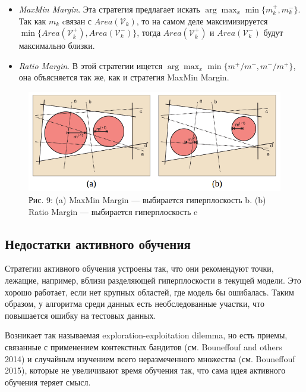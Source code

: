 \documentclass[]{article}
\begin{document}
\begin{itemize}
\item
  \emph{MaxMin Margin}. Эта стратегия предлагает искать
  \(\arg\max_x \min\{m^+_k, m^-_k\}\). Так как \(m_k\) cвязан с
  \(Area(\mathcal{V}_k)\), то на самом деле максимизируется
  \(\min\{Area(\mathcal{V}_k^+), Area(\mathcal{V}^-_k)\}\), тогда
  \(Area(\mathcal{V}_k^+)\) и \(Area(\mathcal{V}^-_k)\) будут
  максимально близки.
\item
  \emph{Ratio Margin}. В этой стратегии ищется
  \(\arg\max_x \min\{m^+/m^-, m^-/m^+\}\), она объясняется так же, как и
  стратегия MaxMin Margin.
\end{itemize}

\begin{figure}[htbp]
\centering
\includegraphics[width=5.72917in]{img/maxminmargin.png}
\caption{Рис. 9: (a) MaxMin Margin --- выбирается гиперплоскость b. (b)
Ratio Margin --- выбирается гиперплоскость e}
\end{figure}

\subsection{Недостатки активного
обучения}\label{ux43dux435ux434ux43eux441ux442ux430ux442ux43aux438-ux430ux43aux442ux438ux432ux43dux43eux433ux43e-ux43eux431ux443ux447ux435ux43dux438ux44f}

Стратегии активного обучения устроены так, что они рекомендуют точки,
лежащие, например, вблизи разделяющей гиперплоскости в текущей модели.
Это хорошо работает, если нет крупных областей, где модель бы ошибалась.
Таким образом, у алгоритма среди данных есть необследованные участки,
что повышается ошибку на тестовых данных.

Возникает так называемая exploration-exploitation dilemma, но есть
приемы, связанные с применением контекстных бандитов (см. Bouneffouf and
others 2014) и случайным изучением всего неразмеченного множества (см.
Bouneffouf 2015), которые не увеличивают время обучения так, что сама
идея активного обучения теряет смысл.
\end{document}
